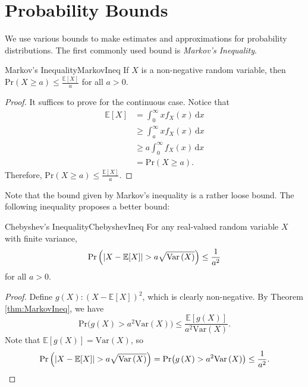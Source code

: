 \documentclass[math]{amznotes}
\theoremstyle{remark}
\renewcommand{\d}{\mathrm{d}}
\begin{document}
\section{Probability Bounds}
We use various bounds to make estimates and approximations for probability distributions. The first commonly used bound is \textit{Markov's Inequality}.
\begin{thmbox}{Markov's Inequality}{MarkovIneq}
    If $X$ is a non-negative random variable, then $\mathrm{Pr}\left(X \geq a\right) \leq \frac{\mathbb{E}[X]}{a}$ for all $a > 0$.
    \tcblower
    \begin{proof}
        It suffices to prove for the continuous case. Notice that 
        \begin{align*}
            \mathbb{E}[X] & = \int_{0}^{\infty}\!xf_X\left(x\right)\,\d x \\
            & \geq \int_{a}^{\infty}\!xf_X\left(x\right)\,\d x \\
            & \geq a\int_{0}^{\infty}\!f_X\left(x\right)\,\d x \\
            & = \mathrm{Pr}\left(X \geq a\right).
        \end{align*}
        Therefore, $\mathrm{Pr}\left(X \geq a\right) \leq \frac{\mathbb{E}[X]}{a}$.
    \end{proof}
\end{thmbox}
Note that the bound given by Markov's inequality is a rather loose bound. The following inequality proposes a better bound:
\begin{thmbox}{Chebyshev's Inequality}{ChebyshevIneq}
    For any real-valued random variable $X$ with finite variance, 
    \begin{equation*}
        \mathrm{Pr}\left({\left\lvert {X - \mathbb{E}[X]} \right\rvert} > a\sqrt{\mathrm{Var}\left(X\right)}\right) \leq \frac{1}{a^2}
    \end{equation*}
    for all $a > 0$.
    \tcblower
    \begin{proof}
        Define $g\left(X\right) \colon \left(X - \mathbb{E}[X]\right)^2$, which is clearly non-negative. By Theorem \ref{thm:MarkovIneq}, we have 
        \begin{equation*}
            \mathrm{Pr}\bigl(g\left(X\right) > a^2\mathrm{Var}\left(X\right)\bigr) \leq \frac{\mathbb{E}[g\left(X\right)]}{a^2\mathrm{Var}\left(X\right)}.
        \end{equation*}
        Note that $\mathbb{E}[g\left(X\right)] = \mathrm{Var}\left(X\right)$, so 
        \begin{equation*}
            \mathrm{Pr}\left({\left\lvert {X - \mathbb{E}[X]} \right\rvert} > a\sqrt{\mathrm{Var}\left(X\right)}\right) = \mathrm{Pr}\bigl(g\left(X\right) > a^2\mathrm{Var}\left(X\right)\bigr) \leq \frac{1}{a^2}.
        \end{equation*}
    \end{proof}
\end{thmbox}
\end{document}
